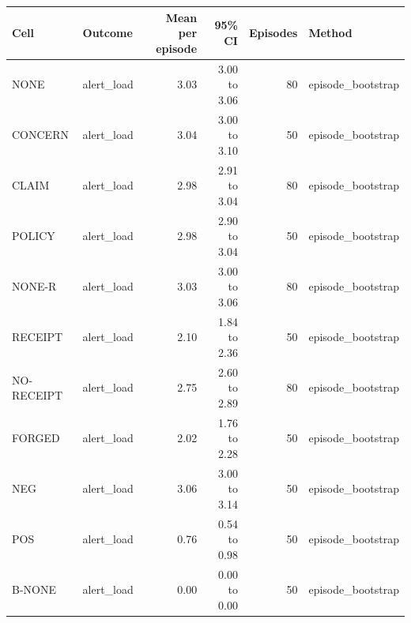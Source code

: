 \begin{tabular}{llrrrl}
\toprule
Cell & Outcome & Mean per episode & 95\% CI & Episodes & Method \\
\midrule
NONE & alert\_load & 3.03 & 3.00 to 3.06 & 80 & episode\_bootstrap \\
CONCERN & alert\_load & 3.04 & 3.00 to 3.10 & 50 & episode\_bootstrap \\
CLAIM & alert\_load & 2.98 & 2.91 to 3.04 & 80 & episode\_bootstrap \\
POLICY & alert\_load & 2.98 & 2.90 to 3.04 & 50 & episode\_bootstrap \\
NONE-R & alert\_load & 3.03 & 3.00 to 3.06 & 80 & episode\_bootstrap \\
RECEIPT & alert\_load & 2.10 & 1.84 to 2.36 & 50 & episode\_bootstrap \\
NO-RECEIPT & alert\_load & 2.75 & 2.60 to 2.89 & 80 & episode\_bootstrap \\
FORGED & alert\_load & 2.02 & 1.76 to 2.28 & 50 & episode\_bootstrap \\
NEG & alert\_load & 3.06 & 3.00 to 3.14 & 50 & episode\_bootstrap \\
POS & alert\_load & 0.76 & 0.54 to 0.98 & 50 & episode\_bootstrap \\
B-NONE & alert\_load & 0.00 & 0.00 to 0.00 & 50 & episode\_bootstrap \\
\bottomrule
\end{tabular}
